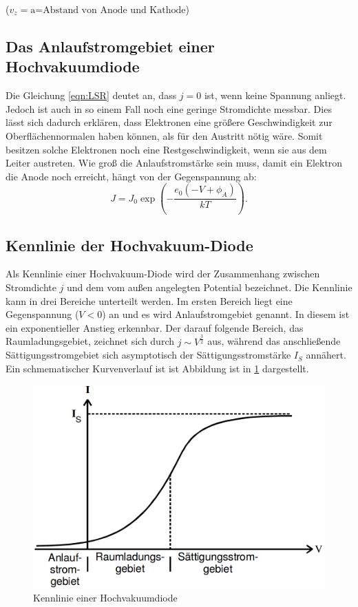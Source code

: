 \begin{center}
 \tiny {($v_z=\text{a=Abstand von Anode und Kathode}$)}
\end{center}

\subsection{Das Anlaufstromgebiet einer Hochvakuumdiode}
Die Gleichung \eqref{eqn:LSR} deutet an, dass $j=0$ ist, wenn keine Spannung anliegt. Jedoch ist auch in so einem Fall noch eine geringe Stromdichte messbar.
Dies lässt sich dadurch erklären, dass Elektronen eine größere Geschwindigkeit zur Oberflächennormalen haben können, als für den Austritt nötig wäre.
Somit besitzen solche Elektronen noch eine Restgeschwindigkeit, wenn sie aus dem Leiter austreten.
Wie groß die Anlaufstromstärke sein muss, damit ein Elektron die Anode noch erreicht, hängt von der Gegenspannung ab:
\begin{equation}
  J = J_0 \exp\left(-\frac{e_0 (-V +\phi_A)}{k T}\right)\text{.} \label{eqn:Anlaufstromstärke}
\end{equation}

\subsection{Kennlinie der Hochvakuum-Diode}
Als Kennlinie einer Hochvakuum-Diode wird der Zusammenhang zwischen Stromdichte $j$ und dem vom außen angelegten Potential bezeichnet.
Die Kennlinie kann in drei Bereiche unterteilt werden. Im ersten Bereich liegt eine Gegenspannung ($V<0$) an und es wird Anlaufstromgebiet genannt. In diesem ist ein exponentieller Anstieg erkennbar.
Der darauf folgende Bereich, das Raumladungsgebiet, zeichnet sich durch $ j \sim V^{\frac{3}{2}}$ aus, während das anschließende Sättigungsstromgebiet sich asymptotisch der
Sättigungsstromstärke $I_S$ annähert.
Ein schmematischer Kurvenverlauf ist ist Abbildung ist in \ref{fig:KHD} dargestellt.
\begin{figure}[H]
  \centering
  \includegraphics[scale=0.35]{Text/Bilder/Kennlinie.png}
  \caption{Kennlinie einer Hochvakuumdiode \cite[100]{sample}}
  \label{fig:KHD}
\end{figure}
